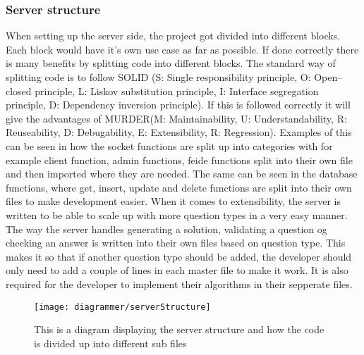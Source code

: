 \subsubsection{Server structure}
When setting up the server side, the project got divided into different blocks. Each block would have it's own use case as far as possible. If done correctly there is many benefits by splitting code into different blocks. The standard way of splitting code is to follow SOLID (S: Single responsibility principle, O: Open–closed principle, L: Liskov substitution principle, I: Interface segregation principle, D: Dependency inversion principle). If this is followed correctly it will give the advantages of MURDER(M: Maintainability, U: Understandability, R: Reuseability, D: Debugability, E: Extensibility, R: Regression). Examples of this can be seen in how the socket functions are split up into categories with for example client function, admin functions, feide functions split into their own file and then imported where they are needed. The same can be seen in the database functions, where get, insert, update and delete functions are split into their own files to make development easier. When it comes to extensibility, the server is written to be able to scale up with more question types in a very easy manner. The way the server handles generating a solution, validating a question og checking an answer is written into their own files based on question type. This makes it so that if another question type should be added, the developer should only need to add a couple of lines in each master file to make it work. It is also required for the developer to implement their algorithms in their sepperate files.
\begin{figure}[H]
    \centering
    \texttt{[image: diagrammer/serverStructure]}
    \caption{This is a diagram displaying the server structure and how the code is divided up into different sub files}
    \label{fig:serverStructure}
\end{figure}